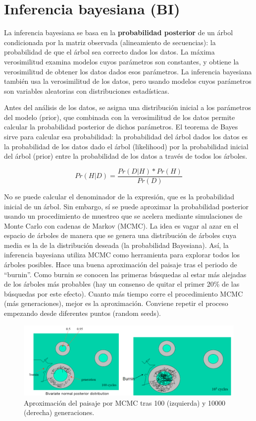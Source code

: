 \chapter{Inferencia bayesiana (BI)}
La inferencia bayesiana se basa en la \textbf{probabilidad posterior} de un árbol condicionada por la matriz observada (alineamiento de secuencias): la probabilidad de que el árbol sea correcto dados los datos. La máxima verosimilitud examina modelos cuyos parámetros son constantes, y obtiene la verosimilitud de obtener los datos dados esos parámetros. La inferencia bayesiana también usa la verosimilitud de los datos, pero usando modelos cuyos parámetros son variables aleatorias con distribuciones estadísticas. 

Antes del análisis de los datos, se asigna una distribución inicial a los parámetros del modelo (prior), que combinada con la verosimilitud de los datos permite calcular la probabilidad posterior de dichos parámetros. El teorema de Bayes sirve para calcular esa probabilidad: la probabilidad del árbol dados los datos es la probabilidad de los datos dado el árbol (likelihood) por la probabilidad inicial del árbol (prior) entre la probabilidad de los datos a través de todos los árboles.

$$ Pr(H|D) = \frac{Pr(D|H) * Pr(H)}{Pr(D)}$$

No se puede calcular el denominador de la expresión, que es la probabilidad inicial de un árbol. Sin embargo, sí se puede aproximar la probabilidad posterior usando un procedimiento de muestreo que se acelera mediante simulaciones de Monte Carlo con cadenas de Markov (MCMC). La idea es vagar al azar en el espacio de árboles de manera que se genera una distribución de árboles cuya media es la de la distribución deseada (la probabilidad Bayesiana). Así, la inferencia bayesiana utiliza MCMC como herramienta para explorar todos los árboles posibles. Hace una buena aproximación del paisaje tras el periodo de “burnin”. Como burnin se conocen las primeras búsquedas al estar más alejadas de los árboles más probables (hay un consenso de quitar el primer 20\% de las búsquedas por este efecto). Cuanto más tiempo corre el procedimiento MCMC (más generaciones), mejor es la aproximación. Conviene repetir el proceso empezando desde diferentes puntos (random seeds).

\begin{figure}[htbp]
\centering
\includegraphics[width=0.5\linewidth]{figs/mcmc.png}
\caption{Aproximación del paisaje por MCMC tras 100 (izquierda) y 10000 (derecha) generaciones.}
\end{figure}

